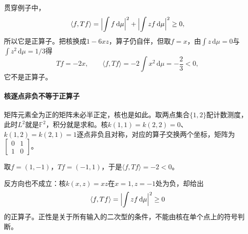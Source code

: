 贯穿例子中，
\[
 \langle f,Tf\rangle=\Bigl\lvert\int f\,\mathrm d\mu\Bigr\rvert^2+\Bigl\lvert\int zf\,\mathrm d\mu\Bigr\rvert^2\geq0,
\]
所以它是正算子。把核换成$1-6xz$，算子仍自伴，但取$f=x$，由$\int z\,\mathrm d\mu=0$与$\int z^2\,\mathrm d\mu=1/3$得
\[
 Tf=-2x,\qquad\langle f,Tf\rangle=-2\int x^2\,\mathrm d\mu=-\frac23<0,
\]
它不是正算子。

\paragraph{核逐点非负不等于正算子}
矩阵元素全为正的矩阵未必半正定，核也是如此。取两点集合$\{1,2\}$配计数测度，此时$L^2$就是$\mathbb F^2$，积分就是求和。核$k(1,1)=k(2,2)=0$、$k(1,2)=k(2,1)=1$逐点非负且对称，对应的算子交换两个坐标，矩阵为$\left[\begin{smallmatrix}0&1\\1&0\end{smallmatrix}\right]$。

取$f=(1,-1)$，$Tf=(-1,1)$，于是$\langle f,Tf\rangle=-2<0$。

反方向也不成立：核$k(x,z)=xz$在$x=1,z=-1$处为负，却给出
\[
 \langle f,Tf\rangle=\Bigl\lvert\int zf\,\mathrm d\mu\Bigr\rvert^2\geq0
\]
的正算子。正性是关于所有输入的二次型的条件，不能由核在单个点上的符号判断。

